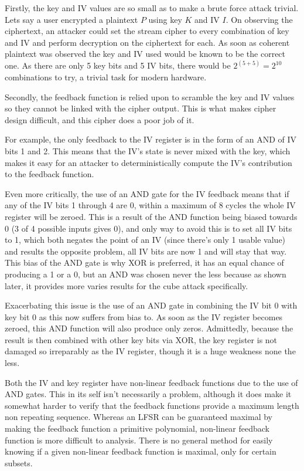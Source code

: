 \documentclass{report}
\begin{document}
Firstly, the key and IV values are so small as to make a brute force attack trivial. Lets say a user encrypted a plaintext $P$ using key $K$ and IV $I$. On observing the ciphertext, an attacker could set the stream cipher to every combination of key and IV and perform decryption on the ciphertext for each. As soon as coherent plaintext was observed the key and IV used would be known to be the correct one. As there are only 5 key bits and 5 IV bits, there would be $2^(5+5) = 2^10$ combinations to try, a trivial task for modern hardware.

Secondly, the feedback function is relied upon to scramble the key and IV values so they cannot be linked with the cipher output. This is what makes cipher design difficult, and this cipher does a poor job of it.

For example, the only feedback to the IV register is in the form of an AND of IV bits 1 and 2. This means that the IV's state is never mixed with the key, which makes it easy for an attacker to deterministically compute the IV's contribution to the feedback function.

Even more critically, the use of an AND gate for the IV feedback means that if any  of the IV bits 1 through 4 are 0, within a maximum of 8 cycles the whole IV register will be zeroed. This is a result of the AND function being biased towards 0 (3 of 4 possible inputs gives 0), and only way to avoid this is to set all IV bits to 1, which both negates the point of an IV (since there's only 1 usable value) and results the opposite problem, all IV bits are now 1 and will stay that way. This bias of the AND gate is why XOR is preferred, it has an equal chance of producing a 1 or a 0, but an AND was chosen never the less because as shown later, it provides more varies results for the cube attack 
specifically.

Exacerbating this issue is the use of an AND gate in combining the IV bit 0 with key bit 0 as this now suffers from bias to. As soon as the IV register becomes zeroed, this AND function will also produce only zeros. Admittedly, because the result is then combined with other key bits via XOR, the key register is not damaged so irreparably as the IV register, though it is a huge weakness none the less.

Both the IV and key register have non-linear feedback functions due to the use of AND gates. This in its self isn't necessarily a problem, although it does make it somewhat harder to verify that the feedback functions provide a maximum length non repeating sequence. Whereas an LFSR can be guaranteed maximal by making the feedback function a primitive polynomial, non-linear feedback function is more difficult to analysis. There is no general method for easily knowing if a given non-linear feedback function is maximal, only for certain subsets\cite{nlfsrFeedback}.
\end{document}
